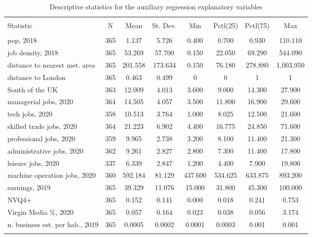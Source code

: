 \documentclass[Royal,times,sageh]{sagej}
\begin{document}
\begin{table}[!htbp] \centering 
  \caption{Descriptive statistics for the auxiliary regression explanatory variables\label{descr.aux}} 
  \label{} 
\footnotesize 
\begin{tabular}{@{\extracolsep{0pt}}lccccccc} 
\\[-1.8ex]\hline 
\hline \\[-1.8ex] 
Statistic & \multicolumn{1}{c}{N} & \multicolumn{1}{c}{Mean} & \multicolumn{1}{c}{St. Dev.} & \multicolumn{1}{c}{Min} & \multicolumn{1}{c}{Pctl(25)} & \multicolumn{1}{c}{Pctl(75)} & \multicolumn{1}{c}{Max} \\ 
\hline \\[-1.8ex] 
pop, 2018 & 365 & 1.137 & 5.726 & 0.400 & 0.700 & 0.930 & 110.110 \\ 
job density, 2018 & 365 & 53.269 & 57.700 & 0.150 & 22.050 & 69.290 & 544.090 \\ 
distance to nearest met. area & 365 & 201.558 & 173.634 & 0.150 & 76.180 & 278.880 & 1,003.950 \\ 
distance to London & 365 & 0.463 & 0.499 & 0 & 0 & 1 & 1 \\ 
South of the UK & 363 & 12.009 & 4.013 & 3.600 & 9.000 & 14.300 & 27.900 \\ 
managerial jobs, 2020 & 364 & 14.505 & 4.057 & 3.500 & 11.800 & 16.900 & 29.600 \\ 
tech jobs, 2020 & 358 & 10.513 & 3.764 & 1.000 & 8.025 & 12.500 & 21.600 \\ 
skilled trade jobs, 2020 & 364 & 21.223 & 6.902 & 4.400 & 16.775 & 24.850 & 71.600 \\ 
professional jobs, 2020 & 359 & 9.965 & 2.738 & 3.200 & 8.100 & 11.400 & 21.300 \\ 
administrative jobs, 2020 & 362 & 9.261 & 2.827 & 2.800 & 7.300 & 11.400 & 17.800 \\ 
leisure jobs, 2020 & 337 & 6.339 & 2.847 & 1.200 & 4.400 & 7.900 & 19.800 \\ 
machine operation jobs, 2020 & 360 & 592.184 & 81.129 & 437.600 & 534.625 & 633.875 & 893.200 \\ 
earnings, 2019 & 365 & 39.329 & 11.076 & 15.000 & 31.800 & 45.300 & 100.000 \\ 
NVQ4+ & 365 & 0.152 & 0.141 & 0.000 & 0.018 & 0.241 & 0.753 \\ 
Virgin Media \%, 2020 & 365 & 0.057 & 0.164 & 0.023 & 0.038 & 0.056 & 3.174 \\ 
n. business est. per hab., 2019 & 365 & 0.0005 & 0.0002 & 0.0001 & 0.0003 & 0.001 & 0.001 \\ 
\hline \\[-1.8ex] 
\end{tabular} 
\end{table}



\end{document}
